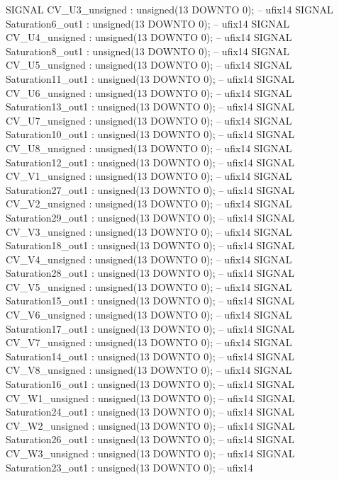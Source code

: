 \begin{mylisting}[language=VHDL,caption=MSSRDCDB制御\&SVPWMモジュール,label=appF_Control_top2_module_VHDL]
  SIGNAL CV_U3_unsigned                   : unsigned(13 DOWNTO 0);  -- ufix14
  SIGNAL Saturation6_out1                 : unsigned(13 DOWNTO 0);  -- ufix14
  SIGNAL CV_U4_unsigned                   : unsigned(13 DOWNTO 0);  -- ufix14
  SIGNAL Saturation8_out1                 : unsigned(13 DOWNTO 0);  -- ufix14
  SIGNAL CV_U5_unsigned                   : unsigned(13 DOWNTO 0);  -- ufix14
  SIGNAL Saturation11_out1                : unsigned(13 DOWNTO 0);  -- ufix14
  SIGNAL CV_U6_unsigned                   : unsigned(13 DOWNTO 0);  -- ufix14
  SIGNAL Saturation13_out1                : unsigned(13 DOWNTO 0);  -- ufix14
  SIGNAL CV_U7_unsigned                   : unsigned(13 DOWNTO 0);  -- ufix14
  SIGNAL Saturation10_out1                : unsigned(13 DOWNTO 0);  -- ufix14
  SIGNAL CV_U8_unsigned                   : unsigned(13 DOWNTO 0);  -- ufix14
  SIGNAL Saturation12_out1                : unsigned(13 DOWNTO 0);  -- ufix14
  SIGNAL CV_V1_unsigned                   : unsigned(13 DOWNTO 0);  -- ufix14
  SIGNAL Saturation27_out1                : unsigned(13 DOWNTO 0);  -- ufix14
  SIGNAL CV_V2_unsigned                   : unsigned(13 DOWNTO 0);  -- ufix14
  SIGNAL Saturation29_out1                : unsigned(13 DOWNTO 0);  -- ufix14
  SIGNAL CV_V3_unsigned                   : unsigned(13 DOWNTO 0);  -- ufix14
  SIGNAL Saturation18_out1                : unsigned(13 DOWNTO 0);  -- ufix14
  SIGNAL CV_V4_unsigned                   : unsigned(13 DOWNTO 0);  -- ufix14
  SIGNAL Saturation28_out1                : unsigned(13 DOWNTO 0);  -- ufix14
  SIGNAL CV_V5_unsigned                   : unsigned(13 DOWNTO 0);  -- ufix14
  SIGNAL Saturation15_out1                : unsigned(13 DOWNTO 0);  -- ufix14
  SIGNAL CV_V6_unsigned                   : unsigned(13 DOWNTO 0);  -- ufix14
  SIGNAL Saturation17_out1                : unsigned(13 DOWNTO 0);  -- ufix14
  SIGNAL CV_V7_unsigned                   : unsigned(13 DOWNTO 0);  -- ufix14
  SIGNAL Saturation14_out1                : unsigned(13 DOWNTO 0);  -- ufix14
  SIGNAL CV_V8_unsigned                   : unsigned(13 DOWNTO 0);  -- ufix14
  SIGNAL Saturation16_out1                : unsigned(13 DOWNTO 0);  -- ufix14
  SIGNAL CV_W1_unsigned                   : unsigned(13 DOWNTO 0);  -- ufix14
  SIGNAL Saturation24_out1                : unsigned(13 DOWNTO 0);  -- ufix14
  SIGNAL CV_W2_unsigned                   : unsigned(13 DOWNTO 0);  -- ufix14
  SIGNAL Saturation26_out1                : unsigned(13 DOWNTO 0);  -- ufix14
  SIGNAL CV_W3_unsigned                   : unsigned(13 DOWNTO 0);  -- ufix14
  SIGNAL Saturation23_out1                : unsigned(13 DOWNTO 0);  -- ufix14

\end{mylisting}
